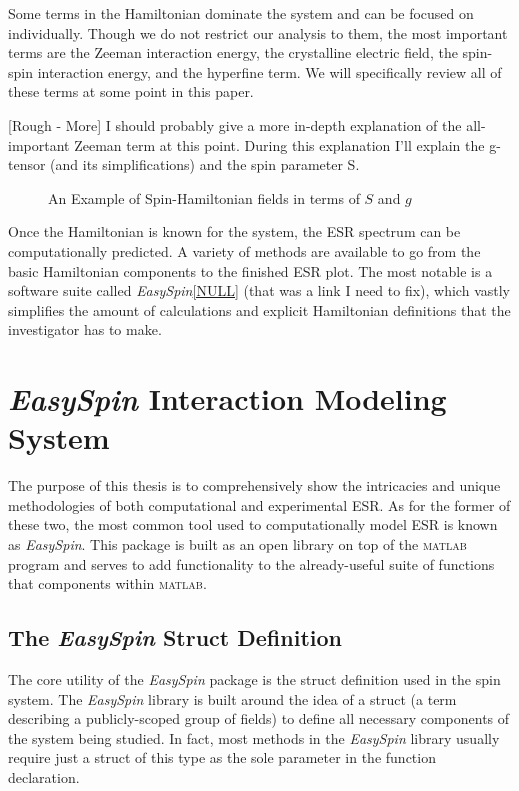 \documentclass[oneside, astronomy, noacknowlegments]{BYUPhys}
\begin{document}
Some terms in the Hamiltonian dominate the system and can be focused on individually. Though we do not restrict our analysis to them, the most important terms are the Zeeman interaction energy, the crystalline electric field, the spin-spin interaction energy, and the hyperfine term. We will specifically review all of these terms at some point in this paper.

[Rough - More] I should probably give a more in-depth explanation of the all-important Zeeman term at this point. During this explanation I'll explain the g-tensor (and its simplifications) and the spin parameter S.

\begin{figure}
    \caption[Example of spin-hamiltonion fields]{\label{fig:HamFields}
     An Example of Spin-Hamiltonian fields in terms of $S$ and $g$}
 \end{figure}

Once the Hamiltonian is known for the system, the ESR spectrum can be computationally predicted. A variety of methods are available to go from the basic Hamiltonian components to the finished ESR plot. The most notable is a software suite called \textit{EasySpin}\ref{NULL} (that was a link I need to fix), which vastly simplifies the amount of calculations and explicit Hamiltonian definitions that the investigator has to make.

\section{\textit{EasySpin} Interaction Modeling System}

The purpose of this thesis is to comprehensively show the intricacies and unique methodologies of both computational and experimental ESR. As for the former of these two, the most common tool used to computationally model ESR is known as \textit{EasySpin}. This package is built as an open library on top of the \textsc{matlab} program and serves to add functionality to the already-useful suite of functions that components within \textsc{matlab}.

\subsection{The \textit{EasySpin} Struct Definition}

The core utility of the \textit{EasySpin} package is the struct definition used in the spin system. The \textit{EasySpin} library is built around the idea of a struct (a term describing a publicly-scoped group of fields) to define all necessary components of the system being studied. In fact, most methods in the \textit{EasySpin} library usually require just a struct of this type as the sole parameter in the function declaration.
\end{document}
